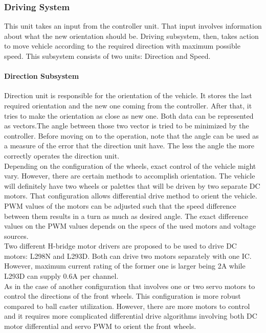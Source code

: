 \documentclass[a4paper,12pt]{article}
\begin{document}
		
	\subsubsection{Driving System}
		This unit takes an input from the controller unit. That input involves information about what the new orientation should be. Driving subsystem, then, takes action to move vehicle according to the required direction with maximum possible speed. This subsystem consists of two units: Direction and Speed.

		\paragraph{Direction Subsystem}
			Direction unit is responsible for the orientation of the vehicle. It stores the last required orientation and the new one coming from the controller. After that, it tries to make the orientation as close as new one. Both data can be represented as vectors.The angle between those two vector is tried to be minimized by the controller. Before moving on to the operation, note that the angle can be used as a measure of the error that the direction unit have. The less the angle the more correctly operates the direction unit.\\

			Depending on the configuration of the wheels, exact control of the vehicle might vary. However, there are certain methods to accomplish orientation. The vehicle will definitely have two wheels or palettes that will be driven by two separate DC motors. That configuration allows differential drive method to orient the vehicle. PWM values of the motors can be adjusted such that the speed difference between them results in a turn as much as desired angle. The exact difference values on the PWM values depends on the specs of the used motors and voltage sources. \\

			Two different H-bridge motor drivers are proposed to be used to drive DC motors: L298N and L293D. Both can drive two motors separately with one IC. However, maximum current rating of the former one is larger being 2A while L293D can supply 0.6A per channel. \\

			As in the case of another configuration that involves one or two servo motors to control the directions of the front wheels. This configuration is more robust compared to ball caster utilization. However, there are more motors to control and it requires more complicated differential drive algorithms involving both DC motor differential and servo PWM to orient the front wheels.
\end{document}

